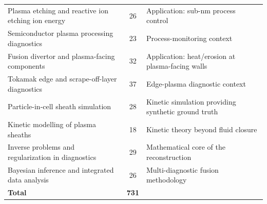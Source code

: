 \documentclass[11pt,a4paper]{article}
\begin{document}
\begin{longtable}{@{}p{6.6cm}c p{6.0cm}@{}}
Plasma etching and reactive ion etching ion energy & 26 & Application: sub-nm process control \\
Semiconductor plasma processing diagnostics & 23 & Process-monitoring context \\
Fusion divertor and plasma-facing components & 32 & Application: heat/erosion at plasma-facing walls \\
Tokamak edge and scrape-off-layer diagnostics & 37 & Edge-plasma diagnostic context \\
Particle-in-cell sheath simulation & 28 & Kinetic simulation providing synthetic ground truth \\
Kinetic modelling of plasma sheaths & 18 & Kinetic theory beyond fluid closure \\
Inverse problems and regularization in diagnostics & 29 & Mathematical core of the reconstruction \\
Bayesian inference and integrated data analysis & 26 & Multi-diagnostic fusion methodology \\
\midrule
\textbf{Total} & \textbf{731} & \\
\bottomrule
\end{longtable}
\end{document}
